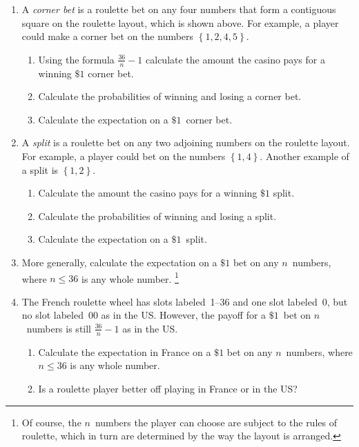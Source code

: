 \documentclass[12pt]{article}
\begin{document}
\begin{enumerate}
\item A {\em corner bet} is a roulette bet on any four numbers that form
a contiguous square on the roulette layout, which is shown above.
For example, a player could make a corner bet on the numbers
$\left\{1,2,4,5\right\}$.
\begin{enumerate}
\item Using the formula $\frac{36}{n}-1$ calculate the amount
the casino pays for a winning $\$1$ corner bet.
\vspace{1cm}
\item Calculate the probabilities of winning and losing a corner bet.
\vspace{1cm}
\item Calculate the expectation on a $\$1$~corner bet.
\vspace{1cm}
\end{enumerate}
\newpage

\item A {\em split} is a roulette bet on any two adjoining numbers
on the roulette layout.
For example, a player could bet on the numbers
$\left\{1,4\right\}$.
Another example of a split is $\left\{1,2\right\}$.
\begin{enumerate}
\item Calculate the amount the casino pays for a winning $\$1$ split.
\vspace{1cm}
\item Calculate the probabilities of winning and losing a split.
\vspace{1cm}
\item Calculate the expectation on a $\$1$~split.
\vspace{1cm}
\end{enumerate}

\item More generally, calculate the expectation
on a $\$1$ bet on any
$n$~numbers, where $n\le 36$ is any whole number.
\footnote{Of course, the $n$~numbers the player can
choose are subject to the rules of roulette, which in turn are determined
by the way the layout is arranged.}
\vspace{3cm}

\item The French roulette wheel has slots
labeled~1--36 and one slot labeled~0, but no
slot labeled~00 as in the US. However, the payoff
for a $\$1$~bet on $n$~numbers is still $\frac{36}{n}-1$
as in the US.
\begin{enumerate}
\item Calculate the expectation in France
on a $\$1$ bet on any
$n$~numbers, where $n\le 36$ is any whole number.
\vspace{1cm}
\item Is a roulette player better off playing in France
or in the US?
\vspace{1cm}
\end{enumerate}

\end{enumerate}
\end{document}
